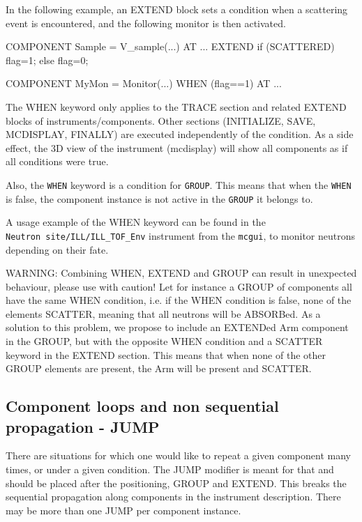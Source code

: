 In the following example, an EXTEND block sets a condition when a scattering
event is encountered, and the following monitor is then activated.
\begin{mcstas}
COMPONENT Sample = V_sample(...) AT ...
  EXTEND
    if (SCATTERED) flag=1; else flag=0;

COMPONENT MyMon = Monitor(...) WHEN (flag==1)
  AT ...
\end{mcstas}

The WHEN keyword only applies to the TRACE section and related EXTEND blocks of
instruments/components. Other sections (INITIALIZE, SAVE, MCDISPLAY, FINALLY)
are executed independently of the condition. As a side effect, the 3D view of
the instrument (mcdisplay) will show all components as if all conditions were
true.

Also, the \verb+WHEN+ keyword is a condition for \verb+GROUP+. This means that
when the \verb+WHEN+ is false, the component instance is not active in the
\verb+GROUP+ it belongs to.

A usage example of the WHEN keyword can be found in the \\
\verb+Neutron site/ILL/ILL_TOF_Env+ instrument from the \verb+mcgui+, to monitor
neutrons depending on their fate.


WARNING: Combining WHEN, EXTEND and GROUP can result in unexpected behaviour,
please use with caution! Let for instance a GROUP of components all have the
same WHEN condition, i.e. if the WHEN condition is false, none of the elements
SCATTER, meaning that all neutrons will be ABSORBed. As a solution to this
problem, we propose to include an EXTENDed Arm component in the GROUP, but with
the opposite WHEN condition and a SCATTER keyword in the EXTEND section. This
means that when none of the other GROUP elements are present, the Arm will be
present and SCATTER.


\subsection{Component loops and non sequential propagation - JUMP}
\label{s:instrdefs-extend-jump}

There are situations for which one would like to repeat a given component many
times, or under a given condition. The JUMP modifier is meant for that and
should be placed after the positioning, GROUP and EXTEND. This breaks the
sequential propagation along components in the instrument description. There may
be more than one JUMP per component instance.

